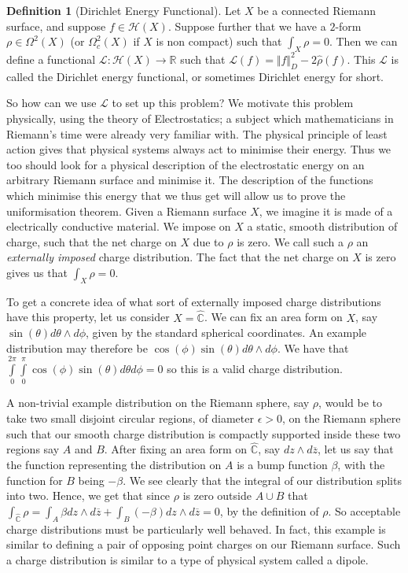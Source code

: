 \documentclass[11pt]{report}
\theoremstyle{definition}
\newtheorem{defn}[thm]{Definition}
\begin{document}
\begin{defn}[Dirichlet Energy Functional]
  Let $X$ be a connected Riemann surface, and suppose $f \in \mathcal{H}(X)$. Suppose further that we have a $2$-form $\rho \in \Omega^2 (X)$ (or $\Omega^2_c (X)$ if $X$ is non compact) such that $\int_X \rho = 0$. Then we can define a functional $\mathcal{L}: \mathcal{H}(X) \rightarrow \mathbb{R}$ such that $\mathcal{L}(f) = \Vert f\Vert ^2_D - 2\hat{\rho}(f)$. This $\mathcal{L}$ is called the Dirichlet energy functional, or sometimes Dirichlet energy for short.
\end{defn}
So how can we use $\mathcal{L}$ to set up this problem? We motivate this problem physically, using the theory of Electrostatics; a subject which mathematicians in Riemann's time were already very familiar with. The physical principle of least action gives that physical systems always act to minimise their energy. Thus we too should look for a physical description of the electrostatic energy on an arbitrary Riemann surface and minimise it. The description of the functions which minimise this energy that we thus get will allow us to prove the uniformisation theorem. Given a Riemann surface $X$, we imagine it is made of a electrically conductive material. We impose on $X$ a static, smooth distribution of charge, such that the net charge on $X$ due to $\rho$ is zero. We call such a $\rho$ an \emph{externally imposed} charge distribution. The fact that the net charge on $X$ is zero gives us that $\int_X \rho = 0$. 

To get a concrete idea of what sort of externally imposed charge distributions have this property, let us consider $X=\widehat{\mathbb{C}}$. We can fix an area form on $X$, say $\sin(\theta) d\theta\wedge d\phi$, given by the standard spherical coordinates. An example distribution may therefore be $\cos(\phi)\sin(\theta)d\theta\wedge d\phi$. We have that $\int\limits_0^{2\pi}\int\limits_0^{\pi} \cos(\phi)\sin(\theta)d\theta d\phi = 0$ so this is a valid charge distribution.

A non-trivial example distribution on the Riemann sphere, say $\rho$, would be to take two small disjoint circular regions, of diameter $\epsilon > 0$, on the Riemann sphere such that our smooth charge distribution is compactly supported inside these two regions say $A$ and $B$. After fixing an area form on $\widehat{\mathbb{C}}$, say $dz \wedge d\overline{z}$, let us say that the function representing the distribution on $A$ is a bump function $\beta$, with the function for $B$ being $-\beta$. We see clearly that the integral of our distribution splits into two. Hence, we get that since $\rho$ is zero outside $A \cup B$ that $\int_{\widehat{\mathbb{C}}} \rho = \int_A \beta dz\wedge d\overline{z} + \int_B (-\beta) dz\wedge d\overline{z} = 0$, by the definition of $\rho$. So acceptable charge distributions must be particularly well behaved. In fact, this example is similar to defining a pair of opposing point charges on our Riemann surface. Such a charge distribution is similar to a type of physical system called a dipole. 
\end{document}

